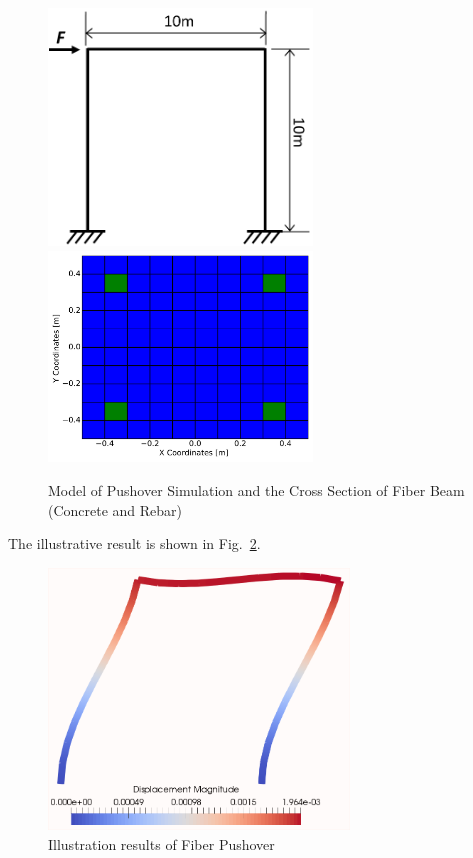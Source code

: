\begin{figure}[H]
  \centering
  \includegraphics[width = 7cm]{./Figure-files/Day3/Frame_Pushover/overview.pdf}
  \includegraphics[width = 7cm]{./Figure-files/Day3/Frame_Pushover/rectangle_rebar2.pdf}
  \caption{Model of Pushover Simulation and the Cross Section of Fiber Beam (Concrete and Rebar) }
  \label{fig_frame_pushover}
\end{figure}

The illustrative result is shown in Fig.~\ref{fig_day3_fiberbeam_pushover_results}.

\begin{figure}[H]
  \centering
  \includegraphics[width = 8cm]{./Figure-files/Day3/Frame_Pushover/fiberBeamDeform.png}
  \caption{Illustration results of Fiber Pushover}
  \label{fig_day3_fiberbeam_pushover_results}
\end{figure}

